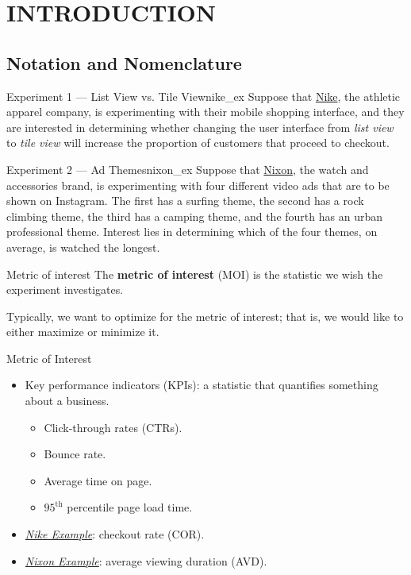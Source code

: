 \chapter{INTRODUCTION}
\section{Notation and Nomenclature}
\begin{Example}{Experiment 1 --- List View vs. Tile View}{nike_ex}
      Suppose that \href{https://www.nike.com/ca/}{Nike}, the athletic apparel company,
      is experimenting with their mobile shopping interface, and they are interested in determining
      whether changing the user interface from \emph{list view}
      to \emph{tile view} will increase the proportion
      of customers that proceed to checkout.
\end{Example}
\begin{Example}{Experiment 2 --- Ad Themes}{nixon_ex}
      Suppose that \href{https://www.nixon.com/ca/en}{Nixon},
      the watch and accessories brand, is experimenting
      with four different video ads that are to be shown on Instagram.
      The first has a surfing theme, the second has a rock climbing theme, the third
      has a camping theme, and the fourth has an urban professional theme.
      Interest lies in determining which of the four themes, on average,
      is watched the longest.
\end{Example}
\begin{Definition}{Metric of interest}{}
      The \textbf{metric of interest} (MOI) is the statistic we wish
      the experiment investigates.
\end{Definition}
\begin{Remark}{}{}
      Typically, we want to optimize for the metric of interest; that is,
      we would like to either maximize or minimize it.
\end{Remark}
\begin{Example}{Metric of Interest}{}
      \begin{itemize}
            \item Key performance indicators (KPIs): a statistic that
                  quantifies something about a business.
                  \begin{itemize}
                        \item Click-through rates (CTRs).
                        \item Bounce rate.
                        \item Average time on page.
                        \item $ 95^{\text{th}} $ percentile page load time.
                  \end{itemize}
            \item \emph{\hyperref[ex:nike_ex]{Nike Example}}: checkout rate (COR).
            \item \emph{\hyperref[ex:nixon_ex]{Nixon Example}}: average viewing duration (AVD).
      \end{itemize}
\end{Example}
